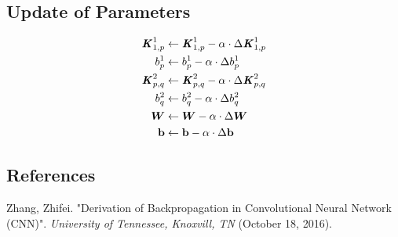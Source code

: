 \documentclass[12pt]{article}
\renewcommand{\vec}[1]{\mathbf{#1}}
\begin{document}
\subsection{Update of Parameters}
\begin{align*}
    \textbf{\textit{K}}_{1, p}^1 &\leftarrow \textbf{\textit{K}}_{1, p}^1 - \alpha \cdot \Delta \textbf{\textit{K}}_{1, p}^1
    \\
    b^1_p &\leftarrow b^1_p - \alpha \cdot \Delta b^1_p
    \\
    \textbf{\textit{K}}_{p, q}^2 &\leftarrow \textbf{\textit{K}}_{p, q}^2 - \alpha \cdot \Delta \textbf{\textit{K}}_{p, q}^2
    \\
    b^2_q &\leftarrow b^2_q - \alpha \cdot \Delta b^2_q
    \\
    \bm{W} &\leftarrow \bm{W} - \alpha \cdot \Delta \bm{W}
    \\
    \vec{b} &\leftarrow \vec{b} - \alpha \cdot \Delta \vec{b}
\end{align*}

\subsection*{References}
Zhang, Zhifei. "Derivation of Backpropagation in
Convolutional Neural Network (CNN)". \textit{University of Tennessee, Knoxvill, TN} (October 18, 2016).
\end{document}
